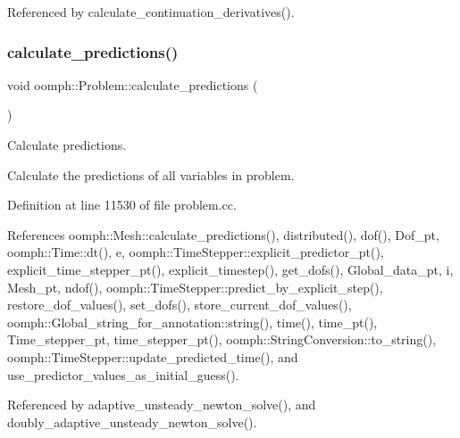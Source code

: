 Referenced by calculate\+\_\+continuation\+\_\+derivatives().

\mbox{\label{classoomph_1_1Problem_a474deeb0947b767566fa1d4630ad8b4a}} 
\subsubsection{\texorpdfstring{calculate\+\_\+predictions()}{calculate\_predictions()}}
{\footnotesize\ttfamily void oomph\+::\+Problem\+::calculate\+\_\+predictions (\begin{DoxyParamCaption}{ }\end{DoxyParamCaption})}



Calculate predictions. 

Calculate the predictions of all variables in problem. 

Definition at line 11530 of file problem.\+cc.



References oomph\+::\+Mesh\+::calculate\+\_\+predictions(), distributed(), dof(), Dof\+\_\+pt, oomph\+::\+Time\+::dt(), e, oomph\+::\+Time\+Stepper\+::explicit\+\_\+predictor\+\_\+pt(), explicit\+\_\+time\+\_\+stepper\+\_\+pt(), explicit\+\_\+timestep(), get\+\_\+dofs(), Global\+\_\+data\+\_\+pt, i, Mesh\+\_\+pt, ndof(), oomph\+::\+Time\+Stepper\+::predict\+\_\+by\+\_\+explicit\+\_\+step(), restore\+\_\+dof\+\_\+values(), set\+\_\+dofs(), store\+\_\+current\+\_\+dof\+\_\+values(), oomph\+::\+Global\+\_\+string\+\_\+for\+\_\+annotation\+::string(), time(), time\+\_\+pt(), Time\+\_\+stepper\+\_\+pt, time\+\_\+stepper\+\_\+pt(), oomph\+::\+String\+Conversion\+::to\+\_\+string(), oomph\+::\+Time\+Stepper\+::update\+\_\+predicted\+\_\+time(), and use\+\_\+predictor\+\_\+values\+\_\+as\+\_\+initial\+\_\+guess().



Referenced by adaptive\+\_\+unsteady\+\_\+newton\+\_\+solve(), and doubly\+\_\+adaptive\+\_\+unsteady\+\_\+newton\+\_\+solve().

\mbox{\label{classoomph_1_1Problem_a93dde63729e7cd332edc1f8904a80649}} 

